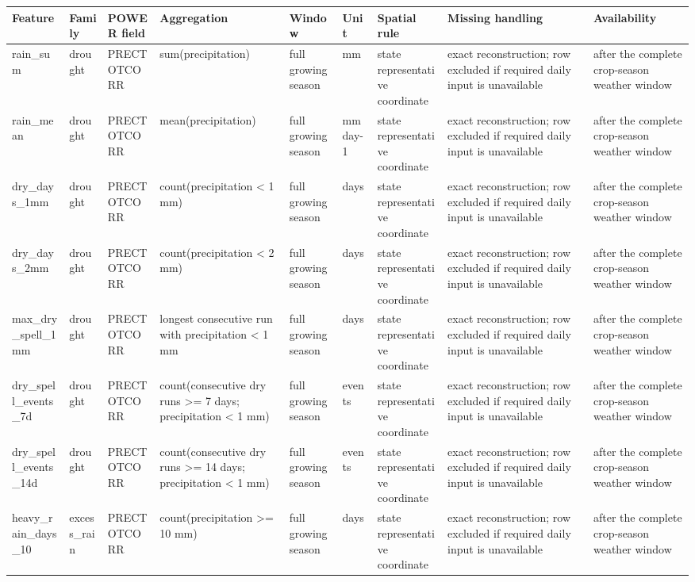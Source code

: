 \begin{tabular}{p{}p{}p{}p{}p{}p{}p{}p{}p{}}
\toprule
Feature & Family & POWER field & Aggregation & Window & Unit & Spatial rule & Missing handling & Availability \\
\midrule
rain\_sum & drought & PRECTOTCORR & sum(precipitation) & full growing season & mm & state representative coordinate & exact reconstruction; row excluded if required daily input is unavailable & after the complete crop-season weather window \\
rain\_mean & drought & PRECTOTCORR & mean(precipitation) & full growing season & mm day-1 & state representative coordinate & exact reconstruction; row excluded if required daily input is unavailable & after the complete crop-season weather window \\
dry\_days\_1mm & drought & PRECTOTCORR & count(precipitation < 1 mm) & full growing season & days & state representative coordinate & exact reconstruction; row excluded if required daily input is unavailable & after the complete crop-season weather window \\
dry\_days\_2mm & drought & PRECTOTCORR & count(precipitation < 2 mm) & full growing season & days & state representative coordinate & exact reconstruction; row excluded if required daily input is unavailable & after the complete crop-season weather window \\
max\_dry\_spell\_1mm & drought & PRECTOTCORR & longest consecutive run with precipitation < 1 mm & full growing season & days & state representative coordinate & exact reconstruction; row excluded if required daily input is unavailable & after the complete crop-season weather window \\
dry\_spell\_events\_7d & drought & PRECTOTCORR & count(consecutive dry runs >= 7 days; precipitation < 1 mm) & full growing season & events & state representative coordinate & exact reconstruction; row excluded if required daily input is unavailable & after the complete crop-season weather window \\
dry\_spell\_events\_14d & drought & PRECTOTCORR & count(consecutive dry runs >= 14 days; precipitation < 1 mm) & full growing season & events & state representative coordinate & exact reconstruction; row excluded if required daily input is unavailable & after the complete crop-season weather window \\
heavy\_rain\_days\_10 & excess\_rain & PRECTOTCORR & count(precipitation >= 10 mm) & full growing season & days & state representative coordinate & exact reconstruction; row excluded if required daily input is unavailable & after the complete crop-season weather window \\

\end{tabular}
